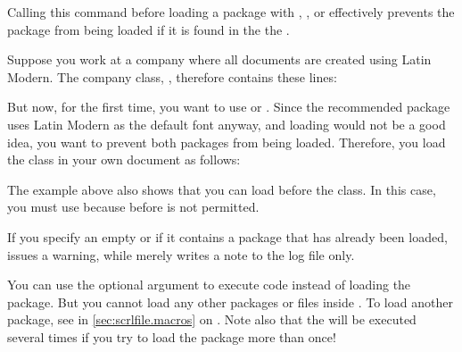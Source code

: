 \begin{Declaration}
\end{Declaration}
Calling this command before loading a
package with ,
, or
effectively prevents the package from being loaded if it is found in the the
.
%
\begin{Example}
  Suppose you work at a company where all documents are created using Latin
  Modern. The company class, , therefore contains these lines:
\begin{lstcode}
  \RequirePackage[T1]{fontenc}
  \RequirePackage{lmodern}
\end{lstcode}
  But now, for the first time, you want to use \XeLaTeX{} or \LuaLaTeX{}.
  Since the recommended  package uses Latin Modern as the
  default font anyway, and loading  would not be a good idea,
  you want to prevent both packages from being loaded. Therefore, you load the
  class in your own document as follows:
\end{Example}
The example above also shows that you can load  before the
class. In this case, you must use
 because 
before  is not permitted.

If you specify an empty  or if it contains a package that
has already been loaded,  issues a warning,
while 
merely writes a note to the log file only.

You can use the optional argument to
execute code instead of loading the package. But you cannot load any other
packages or files inside . To load another package, see
 in \autoref{sec:scrlfile.macros} on
. Note also that the
 will be executed several times if you try to load the
package more than once!%
\EndIndexGroup


